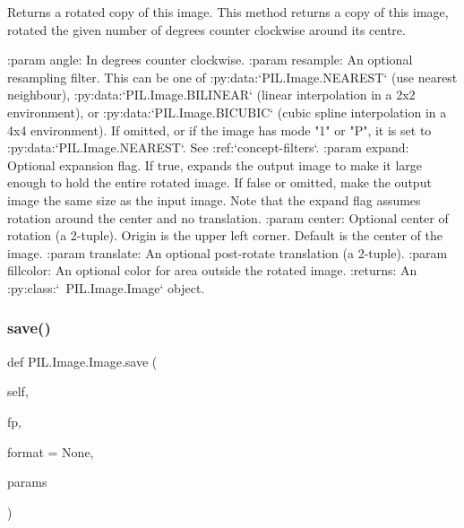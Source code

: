 \begin{DoxyVerb}Returns a rotated copy of this image.  This method returns a
copy of this image, rotated the given number of degrees counter
clockwise around its centre.

:param angle: In degrees counter clockwise.
:param resample: An optional resampling filter.  This can be
   one of :py:data:`PIL.Image.NEAREST` (use nearest neighbour),
   :py:data:`PIL.Image.BILINEAR` (linear interpolation in a 2x2
   environment), or :py:data:`PIL.Image.BICUBIC`
   (cubic spline interpolation in a 4x4 environment).
   If omitted, or if the image has mode "1" or "P", it is
   set to :py:data:`PIL.Image.NEAREST`. See :ref:`concept-filters`.
:param expand: Optional expansion flag.  If true, expands the output
   image to make it large enough to hold the entire rotated image.
   If false or omitted, make the output image the same size as the
   input image.  Note that the expand flag assumes rotation around
   the center and no translation.
:param center: Optional center of rotation (a 2-tuple).  Origin is
   the upper left corner.  Default is the center of the image.
:param translate: An optional post-rotate translation (a 2-tuple).
:param fillcolor: An optional color for area outside the rotated image.
:returns: An :py:class:`~PIL.Image.Image` object.
\end{DoxyVerb}
 \mbox{\label{classPIL_1_1Image_1_1Image_a8d5e8699818c2f558089729d28f34419}} 
\subsubsection{\texorpdfstring{save()}{save()}}
{\footnotesize\ttfamily def P\+I\+L.\+Image.\+Image.\+save (\begin{DoxyParamCaption}\item[{}]{self,  }\item[{}]{fp,  }\item[{}]{format = {\ttfamily None},  }\item[{}]{params }\end{DoxyParamCaption})}

